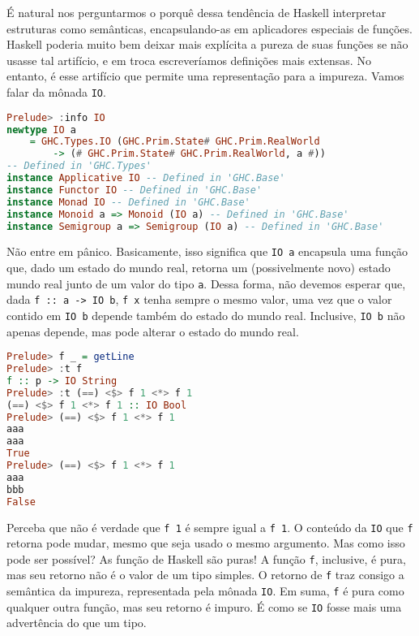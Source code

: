 \documentclass[a4paper]{article}
\begin{document}
É natural nos perguntarmos o porquê dessa tendência de Haskell interpretar estruturas como semânticas, encapsulando-as em aplicadores especiais de funções.
Haskell poderia muito bem deixar mais explícita a pureza de suas funções se não usasse tal artifício, e em troca escreveríamos definições mais extensas.
No entanto, é esse artifício que permite uma representação para a impureza.
Vamos falar da mônada \texttt{IO}.

\begin{lstlisting}[language=haskell, frame=single]
Prelude> :info IO
newtype IO a
	= GHC.Types.IO (GHC.Prim.State# GHC.Prim.RealWorld
		-> (# GHC.Prim.State# GHC.Prim.RealWorld, a #))
-- Defined in 'GHC.Types'
instance Applicative IO -- Defined in 'GHC.Base'
instance Functor IO -- Defined in 'GHC.Base'
instance Monad IO -- Defined in 'GHC.Base'
instance Monoid a => Monoid (IO a) -- Defined in 'GHC.Base'
instance Semigroup a => Semigroup (IO a) -- Defined in 'GHC.Base'
\end{lstlisting}

Não entre em pânico.
Basicamente, isso significa que \texttt{IO a} encapsula uma função que, dado um estado do mundo real, retorna um (possivelmente novo) estado mundo real junto de um valor do tipo \texttt{a}.
Dessa forma, não devemos esperar que, dada \texttt{f :: a -> IO b}, \texttt{f x} tenha sempre o mesmo valor, uma vez que o valor contido em \texttt{IO b} depende também do estado do mundo real.
Inclusive, \texttt{IO b} não apenas depende, mas pode alterar o estado do mundo real.

\begin{lstlisting}[language=haskell, frame=single]
Prelude> f _ = getLine
Prelude> :t f
f :: p -> IO String
Prelude> :t (==) <$> f 1 <*> f 1
(==) <$> f 1 <*> f 1 :: IO Bool
Prelude> (==) <$> f 1 <*> f 1
aaa
aaa
True
Prelude> (==) <$> f 1 <*> f 1
aaa
bbb
False
\end{lstlisting}

Perceba que não é verdade que \texttt{f 1} é sempre igual a \texttt{f 1}.
O conteúdo da \texttt{IO} que \texttt{f} retorna pode mudar, mesmo que seja usado o mesmo argumento.
Mas como isso pode ser possível?
As função de Haskell são puras!
A função \texttt{f}, inclusive, é pura, mas seu retorno não é o valor de um tipo simples.
O retorno de \texttt{f} traz consigo a semântica da impureza, representada pela mônada \texttt{IO}.
Em suma, \texttt{f} é pura como qualquer outra função, mas seu retorno é impuro.
É como se \texttt{IO} fosse mais uma advertência do que um tipo.
\end{document}
